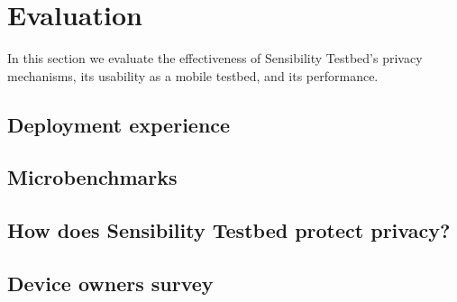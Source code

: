 \section{Evaluation}

In this section we evaluate the effectiveness of Sensibility Testbed's 
privacy mechanisms, its usability as a mobile testbed, and its 
performance.

\subsection{Deployment experience}


\subsection{Microbenchmarks}



\subsection{How does Sensibility Testbed protect privacy?}


\subsection{Device owners survey}

